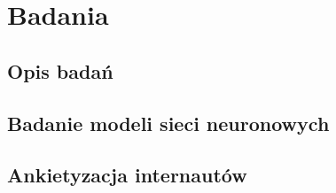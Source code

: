 \chapter{Badania}
\section{Opis badań}
\section{Badanie modeli sieci neuronowych}
\section{Ankietyzacja internautów}


